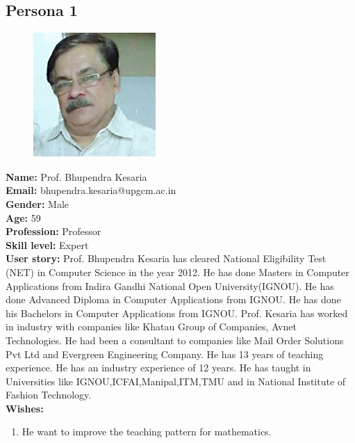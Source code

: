 \documentclass{article}
\begin{document}
\subsection{Persona 1}
\begin{figure}[h!]
    \centering
    \includegraphics{picture}
\end{figure}
\begin{multicols}{2}[]
\noindent
\textbf{Name:} Prof. Bhupendra Kesaria \\
\newline
\textbf{Email:} bhupendra.kesaria@upgcm.ac.in \\
\newline
\textbf{Gender:} Male \\
\newline
\textbf{Age:} 59 \\
\newline
\textbf{Profession:} Professor \\
\newline
\textbf{Skill level:} Expert \\
\newline
\textbf{User story:} Prof. Bhupendra Kesaria has cleared National Eligibility Test (NET) in Computer Science in the year 2012. He has done Masters in Computer Applications from Indira Gandhi National Open University(IGNOU). He has done Advanced Diploma in Computer Applications from IGNOU. He has done his Bachelors in Computer Applications from IGNOU. Prof. Kesaria has worked in industry with companies like Khatau Group of Companies, Avnet Technologies. He had been a consultant to companies like Mail Order Solutions Pvt Ltd and Evergreen Engineering Company. He has 13 years of teaching experience. He has an industry experience of 12 years. He has taught in Universities like IGNOU,ICFAI,Manipal,ITM,TMU and in National Institute of Fashion Technology. \\
\columnbreak
\newline
\textbf{Wishes: } 
\begin{enumerate}
    \item He want to improve the teaching pattern for mathematics.

\end{enumerate}
\end{multicols}
\end{document}
